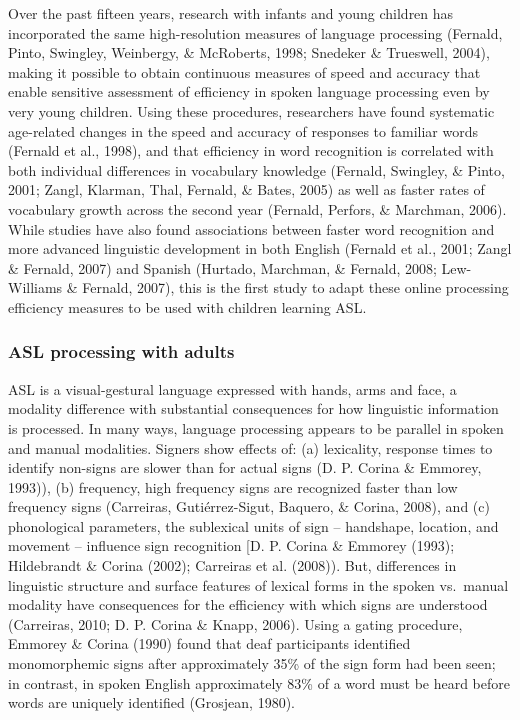 \documentclass[12pt,]{article}
\begin{document}
Over the past fifteen years, research with infants and young children
has incorporated the same high-resolution measures of language
processing (Fernald, Pinto, Swingley, Weinbergy, \& McRoberts, 1998;
Snedeker \& Trueswell, 2004), making it possible to obtain continuous
measures of speed and accuracy that enable sensitive assessment of
efficiency in spoken language processing even by very young children.
Using these procedures, researchers have found systematic age-related
changes in the speed and accuracy of responses to familiar words
(Fernald et al., 1998), and that efficiency in word recognition is
correlated with both individual differences in vocabulary knowledge
(Fernald, Swingley, \& Pinto, 2001; Zangl, Klarman, Thal, Fernald, \&
Bates, 2005) as well as faster rates of vocabulary growth across the
second year (Fernald, Perfors, \& Marchman, 2006). While studies have
also found associations between faster word recognition and more
advanced linguistic development in both English (Fernald et al., 2001;
Zangl \& Fernald, 2007) and Spanish (Hurtado, Marchman, \& Fernald,
2008; Lew-Williams \& Fernald, 2007), this is the first study to adapt
these online processing efficiency measures to be used with children
learning ASL.

\subsubsection{ASL processing with
adults}\label{asl-processing-with-adults}

ASL is a visual-gestural language expressed with hands, arms and face, a
modality difference with substantial consequences for how linguistic
information is processed. In many ways, language processing appears to
be parallel in spoken and manual modalities. Signers show effects of:
(a) lexicality, response times to identify non-signs are slower than for
actual signs (D. P. Corina \& Emmorey, 1993)), (b) frequency, high
frequency signs are recognized faster than low frequency signs
(Carreiras, Guti{é}rrez-Sigut, Baquero, \& Corina, 2008), and (c)
phonological parameters, the sublexical units of sign -- handshape,
location, and movement -- influence sign recognition {[}D. P. Corina \&
Emmorey (1993); Hildebrandt \& Corina (2002); Carreiras et al. (2008)).
But, differences in linguistic structure and surface features of lexical
forms in the spoken vs.~manual modality have consequences for the
efficiency with which signs are understood (Carreiras, 2010; D. P.
Corina \& Knapp, 2006). Using a gating procedure, Emmorey \& Corina
(1990) found that deaf participants identified monomorphemic signs after
approximately 35\% of the sign form had been seen; in contrast, in
spoken English approximately 83\% of a word must be heard before words
are uniquely identified (Grosjean, 1980).
\end{document}
